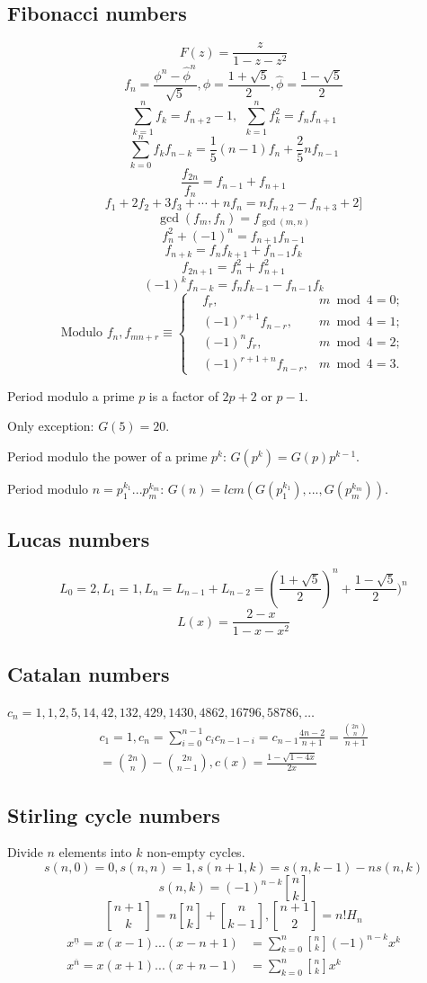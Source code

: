 	\subsection{Fibonacci numbers}
	\[ F(z) = \frac{z}{1-z-z^2} \]
	\[ f_n = \frac{{\phi}^n-{\hat{\phi}}^n}{\sqrt{5}}, \phi = \frac{1+\sqrt{5}}{2},
	\hat{\phi} = \frac{1-\sqrt{5}}{2} \]
	\[ \sum_{k=1}^nf_k = f_{n+2}-1,\ \ \sum_{k=1}^nf^2_k = f_nf_{n+1} \]
	\[ \sum_{k=0}^nf_kf_{n-k} = \frac{1}{5}(n-1)f_n+\frac{2}{5}nf_{n-1} \]
	\[ \frac{f_{2n}}{f_n} = f_{n-1} + f_{n+1}\]
	\[ f_1+2f_2+3f_3+\cdots+nf_n=nf_{n+2}-f_{n+3}+2]\]
	\[ \gcd(f_m,f_n)=f_{\gcd(m,n)}\]
	\[ f^2_n + (-1)^n = f_{n+1}f_{n-1} \]
	\[ f_{n+k} = f_nf_{k+1} + f_{n-1}f_k \]
	\[ f_{2n+1} = f^2_n+f^2_{n+1} \]
	\[ (-1)^kf_{n-k} = f_{n}f_{k-1} - f_{n-1}f_{k} \]
	\[ \text{Modulo }f_n, f_{mn+r} \equiv \left\{
	\begin{aligned}
	&f_r,& m \bmod 4 = 0; \\
	&(-1)^{r+1}f_{n-r},& m \bmod 4 = 1; \\
	&(-1)^nf_r,& m \bmod 4 = 2; \\
	&(-1)^{r+1+n}f_{n-r},& m \bmod 4 = 3.
	\end{aligned}
	\right.
	\]

	Period modulo a prime $p$ is a factor of $2p+2$ or $p-1$.

	Only exception: $G(5)=20$.

	Period modulo the power of a prime $p^k$: $G(p^k)=G(p)p^{k-1}$.

	Period modulo $n=p_1^{k_1}...p_m^{k_m}$: $G(n)=lcm(G(p_1^{k_1}),...,G(p_m^{k_m}))$.

	\subsection{Lucas numbers}
	\[ L_0=2,L_1=1,L_n=L_{n-1}+L_{n-2}=(\frac{1+\sqrt{5}}{2})^n+\frac{1-\sqrt{5}}{2})^n \]
	\[ L(x)=\frac{2-x}{1-x-x^2} \]
	\subsection{Catalan numbers}
  ${c_n = 1, 1, 2, 5, 14, 42, 132, 429, 1430, 4862, 16796, 58786, \dots}$
	\begin{align*}
	c_1=1,c_n=\sum_{i=0}^{n-1}c_ic_{n-1-i}=c_{n-1}\frac{4n-2}{n+1}=\frac{\binom{2n}{n}}{n+1}\\
	=\binom{2n}{n}-\binom{2n}{n-1}, c(x)=\frac{1-\sqrt{1-4x}}{2x}
	\end{align*}
	\subsection{Stirling cycle numbers}
	Divide $n$ elements into $k$ non-empty cycles.
	\[s(n,0)=0,s(n,n)=1,s(n+1,k)=s(n,k-1)-ns(n,k)\]
	\[s(n,k)=(-1)^{n-k}{n \brack k}\]
	\[{n+1 \brack k} = n{n \brack k} + {n \brack k-1},{n+1 \brack 2} = n!H_n\]
	\begin{align*}
	x^{\underline{n}} = x(x-1)...(x-n+1) &= \sum_{k=0}^n{ {n \brack k}(-1)^{n-k}x^k }\\
	x^{\overline{n}} = x(x+1)...(x+n-1) &= \sum_{k=0}^n{ {n \brack k}x^k }\\
	\end{align*}
